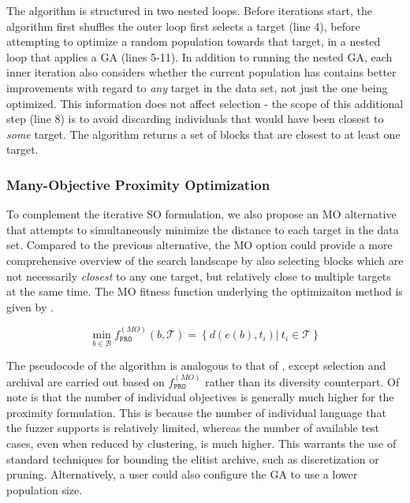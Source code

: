 The algorithm is structured in two nested loops.
Before iterations start, the algorithm first shuffles
the outer loop first selects a target (line 4),
before attempting to optimize a random population towards that target,
in a nested loop that applies a \gls{GA} (lines 5-11).
In addition to running the nested \gls{GA},
each inner iteration also considers whether the current population has
contains better improvements with regard to \textit{any}
target in the data set, not just the one being optimized.
This information does not affect selection -  the scope of this
additional step (line 8) is to avoid discarding individuals
that would have been closest to \textit{some} target.
The algorithm returns a set of blocks that are closest to at least one target.

\subsubsection{Many-Objective Proximity Optimization}

To complement the iterative \gls{SO} formulation, we also propose
an \gls{MO} alternative that attempts to simultaneously minimize the distance
to each target in the data set.
Compared to the previous alternative, the \gls{MO} option could provide a
more comprehensive overview of the search landscape by also
selecting blocks which are not necessarily \textit{closest}
to any one target, but relatively close to multiple targets at the same time.
The \gls{MO} fitness function underlying the optimizaiton method
is given by .


\begin{equation}
\min_{b \in \mathcal{B}} f^{(MO)}_{\texttt{PRO}}(b, \mathcal{T}) = \left\lbrace d(e(b), t_i)|~t_i \in \mathcal{T} \right\rbrace
\label{eq:proximity_mo}
\end{equation}

The pseudocode of the algorithm is analogous to that of , 
except selection and archival are carried out based on $f^{(MO)}_{\texttt{PRO}}$
rather than its diversity counterpart.
Of note is that the number of individual objectives is generally
much higher for the proximity formulation.
This is because the number of individual language that the fuzzer supports
is relatively limited, whereas the number of available test cases, even
when reduced by clustering, is much higher.
This warrants the use of standard techniques for bounding the elitist archive, such
as discretization or pruning.
Alternatively, a user could also configure the \gls{GA} to use a lower population size.

